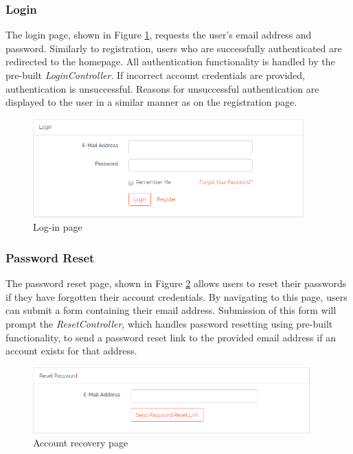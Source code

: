 \subsubsection{Login}
The login page, shown in Figure \ref{fig:LoginPage}, requests the user's email address and password. Similarly to registration, users who are successfully authenticated are redirected to the homepage. All authentication functionality is handled by the pre-built \textit{LoginController}. If incorrect account credentials are provided, authentication is unsuccessful. Reasons for unsuccessful authentication are displayed to the user in a similar manner as on the registration page.

\begin{figure}[H]
\centering
\includegraphics[height=1.5in]{Images/Design/login-page}
\caption{Log-in page}
\label{fig:LoginPage}
\end{figure}

\subsubsection{Password Reset}
The password reset page, shown in Figure \ref{fig:PasswordReset} allows users to reset their passwords if they have forgotten their account credentials. By navigating to this page, users can submit a form containing their email address. Submission of this form will prompt the \textit{ResetController}, which handles password resetting using pre-built functionality, to send a password reset link to the provided email address if an account exists for that address.

\begin{figure}[H]
\centering
\includegraphics[height=1in]{Images/Implementation/PasswordReset}
\caption{Account recovery page}
\label{fig:PasswordReset}
\end{figure}

